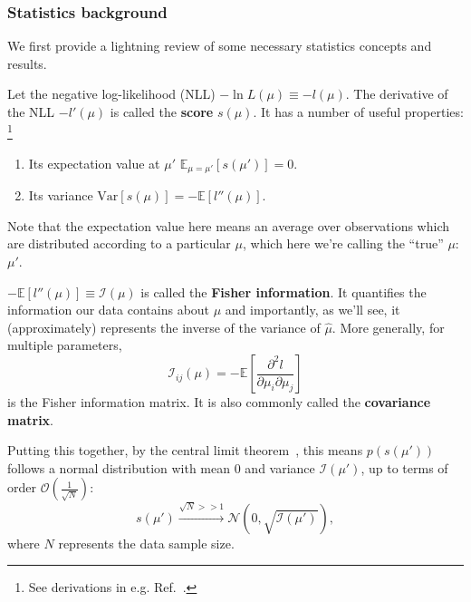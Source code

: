 \subsubsection{Statistics background}
\label{sec:03_pmle_bg}

We first provide a lightning review of some necessary statistics concepts and results.

\begin{definition}
\label{def:03_score}
Let the negative log-likelihood (NLL) $-\ln L(\mu) \equiv -l(\mu)$. 
The derivative of the NLL $-l'(\mu)$ is called the \textbf{score} $s(\mu)$.
It has a number of useful properties:
\footnote{See derivations in e.g. Ref.~\cite{enwiki:1253018821}.}
\begin{enumerate}
  \item Its expectation value at $\mu'$ $\mathbb E_{\mu = \mu'}[s(\mu')] = 0$.
  \item Its variance $\mathrm {Var} [s(\mu)] = - \mathbb E [l''(\mu)]$.
\end{enumerate}
Note that the expectation value here means an average over observations which are distributed according to a particular $\mu$, which here we're calling the ``true'' $\mu$: $\mu'$.
\end{definition}

\begin{definition}
\label{def:03_fisher_information}
$- \mathbb E [l''(\mu)] \equiv \mathcal I(\mu)$ is called the \textbf{Fisher information}.
It quantifies the information our data contains about $\mu$ and importantly, as we'll see, it (approximately) represents the inverse of the variance of $\hat \mu$.
More generally, for multiple parameters,
\begin{equation}
\label{eq:03_fisher_matrix}
\mathcal I_{ij}(\mu) = - \mathbb E [\frac{\partial^2 l}{\partial \mu_i \partial \mu_j}]
\end{equation}
is the Fisher information matrix. 
It is also commonly called the \textbf{covariance matrix}.
\end{definition}

\begin{theorem}
Putting this together, by the central limit theorem~\cite{enwiki:1257009135}, this means $p(s(\mu'))$ follows a normal distribution with mean $0$ and variance $\mathcal I(\mu')$, up to terms of order $\mathcal O(\frac{1}{\sqrt{N}})$:
\begin{equation}
s(\mu') \xrightarrow{\sqrt{N} >> 1} \mathcal N(0, \sqrt{\mathcal I(\mu')}),
\label{eq:03_score}
\end{equation}
where $N$ represents the data sample size.
\end{theorem}


